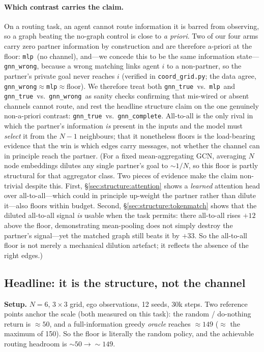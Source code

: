 \documentclass[manuscript, screen, review]{jair}
\newcommand{\gtrue}{\texttt{gnn\_true}}
\newcommand{\gwrong}{\texttt{gnn\_wrong}}
\newcommand{\gcomplete}{\texttt{gnn\_complete}}
\newcommand{\mlpc}{\texttt{mlp}}
\newcommand{\SCfloor}{50}             %
\newcommand{\SCoracle}{149}           %
\begin{document}
\paragraph{Which contrast carries the claim.}
On a routing task, an agent cannot route information it is barred from
observing, so a graph beating the no-graph control is close to \emph{a
priori}. Two of our four arms carry zero partner information by
construction and are therefore a-priori at the floor: \mlpc\ (no channel),
and---we concede this to be the same information state---\gwrong, because a
wrong matching links agent $i$ to a non-partner, so the partner's private
goal never reaches $i$ (verified in \texttt{coord\_grid.py}; the data agree,
\gwrong${\approx}$\mlpc${\approx}$floor). We therefore treat both \gtrue\
vs.\ \mlpc\ and \gtrue\ vs.\ \gwrong\ as sanity checks confirming that
mis-wired or absent channels cannot route, and rest the headline structure
claim on the one genuinely non-a-priori contrast: \gtrue\ vs.\ \gcomplete.
All-to-all is the only rival in which the partner's information \emph{is}
present in the inputs and the model must \emph{select} it from the $N{-}1$
neighbours; that it nonetheless floors is the load-bearing evidence that the
win is which edges carry messages, not whether the channel can in principle
reach the partner. (For a fixed mean-aggregating GCN, averaging $N$ node
embeddings dilutes any single partner's goal to ${\sim}1/N$, so this
floor is partly structural for that aggregator class. Two pieces of evidence
make the claim non-trivial despite this. First, \S\ref{sec:structure:attention}
shows a \emph{learned} attention head over all-to-all---which could in
principle up-weight the partner rather than dilute it---also floors within
budget. Second, \S\ref{sec:structure:tokenmatch} shows that the diluted
all-to-all signal \emph{is} usable when the task permits: there all-to-all rises
$+12$ above the floor, demonstrating mean-pooling does not simply destroy the
partner's signal---yet the matched graph still beats it by $+33$. So the
all-to-all floor is not merely a mechanical dilution artefact; it reflects the
absence of the right edges.)

\subsection{Headline: it is the structure, not the channel}
\label{sec:structure:headline}

\textbf{Setup.} $N{=}6$, $3{\times}3$ grid, ego observations, 12 seeds, 30k
steps. Two reference points anchor the scale (both measured on this task):
the random / do-nothing return is ${\approx}\SCfloor$, and a
full-information greedy \emph{oracle} reaches ${\approx}\SCoracle$
(${\approx}$ the maximum of 150). So the floor is literally the random
policy, and the achievable routing headroom is ${\sim}\SCfloor\to{\sim}\SCoracle$.
\end{document}
